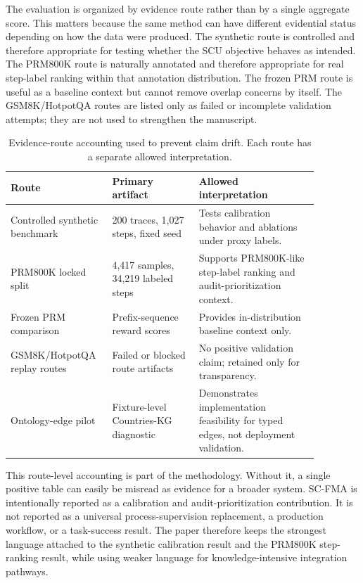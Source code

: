 \documentclass[a4paper,fleqn]{cas-sc}
\begin{document}
The evaluation is organized by evidence route rather than by a single aggregate score. This matters because the same method can have different evidential status depending on how the data were produced. The synthetic route is controlled and therefore appropriate for testing whether the SCU objective behaves as intended. The PRM800K route is naturally annotated and therefore appropriate for real step-label ranking within that annotation distribution. The frozen PRM route is useful as a baseline context but cannot remove overlap concerns by itself. The GSM8K/HotpotQA routes are listed only as failed or incomplete validation attempts; they are not used to strengthen the manuscript.

\begin{table}[ht]
\caption{Evidence-route accounting used to prevent claim drift. Each route has a separate allowed interpretation.}
\label{tab:evidence-routes}
\centering
\small
\renewcommand{\arraystretch}{1.12}
\begin{tabular}{p{0.25\linewidth}p{0.26\linewidth}p{0.36\linewidth}}
\toprule
\textbf{Route} & \textbf{Primary artifact} & \textbf{Allowed interpretation} \\
\midrule
Controlled synthetic benchmark & 200 traces, 1,027 steps, fixed seed & Tests calibration behavior and ablations under proxy labels. \\
PRM800K locked split & 4,417 samples, 34,219 labeled steps & Supports PRM800K-like step-label ranking and audit-prioritization context. \\
Frozen PRM comparison & Prefix-sequence reward scores & Provides in-distribution baseline context only. \\
GSM8K/HotpotQA replay routes & Failed or blocked route artifacts & No positive validation claim; retained only for transparency. \\
Ontology-edge pilot & Fixture-level Countries-KG diagnostic & Demonstrates implementation feasibility for typed edges, not deployment validation. \\
\bottomrule
\end{tabular}
\end{table}

This route-level accounting is part of the methodology. Without it, a single positive table can easily be misread as evidence for a broader system. SC-FMA is intentionally reported as a calibration and audit-prioritization contribution. It is not reported as a universal process-supervision replacement, a production workflow, or a task-success result. The paper therefore keeps the strongest language attached to the synthetic calibration result and the PRM800K step-ranking result, while using weaker language for knowledge-intensive integration pathways.
\end{document}
